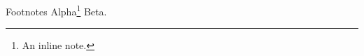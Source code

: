 \documentclass[aspectratio=169]{beamer}
\begin{document}
\begin{frame}{Footnotes}
Alpha\footnote{An inline note.} Beta.
\end{frame}
\end{document}
